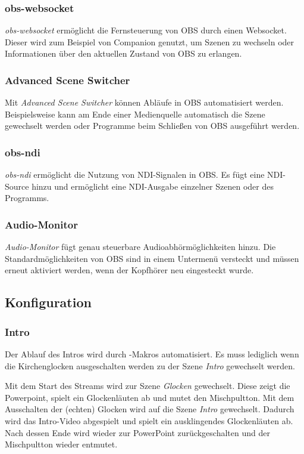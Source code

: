 			\subsubsection{obs-websocket}
				\textit{obs-websocket} ermöglicht die Fernsteuerung von OBS durch einen Websocket.
				Dieser wird zum Beispiel von Companion genutzt, um Szenen zu wechseln oder Informationen über den aktuellen Zustand von OBS zu erlangen.
			\subsubsection{Advanced Scene Switcher}\label{obs:plugins:ass}
				Mit \textit{Advanced Scene Switcher} können Abläufe in \Gls{OBS} automatisiert werden.
				Beispielsweise kann am Ende einer Medienquelle automatisch die Szene gewechselt werden oder Programme beim Schließen von \Gls{OBS} ausgeführt werden.
			\subsubsection{obs-ndi}\label{obs:plugins:ndi}
				\textit{obs-ndi} ermöglicht die Nutzung von \Gls{NDI}-Signalen in \Gls{OBS}.
				Es fügt eine \Gls{NDI}-Source hinzu und ermöglicht eine \Gls{NDI}-Ausgabe einzelner Szenen oder des Programms.
			\subsubsection{Audio-Monitor}
				\textit{Audio-Monitor} fügt genau steuerbare Audioabhörmöglichkeiten hinzu.
				Die Standardmöglichkeiten von OBS sind in einem Untermenü versteckt und müssen erneut aktiviert werden, wenn der Kopfhörer neu eingesteckt wurde.

		\subsection{Konfiguration}
			\subsubsection{Intro}
				Der Ablauf des Intros wird durch -Makros automatisiert.
				Es muss lediglich wenn die Kirchenglocken ausgeschalten werden zu der Szene \textit{Intro} gewechselt werden.

				Mit dem Start des Streams wird zur Szene \textit{Glocken} gewechselt.
				Diese zeigt die Powerpoint, spielt ein Glockenläuten ab und mutet den Mischpultton.
				Mit dem Ausschalten der (echten) Glocken wird auf die Szene \textit{Intro} gewechselt.
				Dadurch wird das Intro-Video abgespielt und spielt ein ausklingendes Glockenläuten ab.
				Nach dessen Ende wird wieder zur PowerPoint zurückgeschalten und der Mischpultton wieder entmutet.
				
